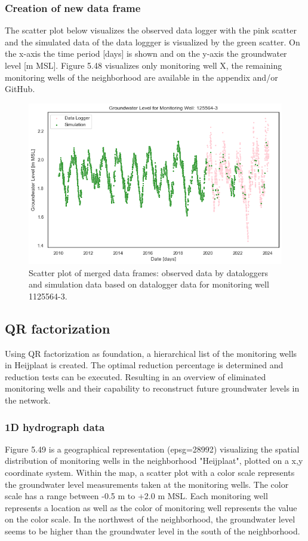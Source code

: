 \subsubsection{Creation of new data frame}
The scatter plot below visualizes the observed data logger with the pink scatter and the simulated data of the data loggger is visualized by the green scatter. On the x-axis the time period [days] is shown and on the y-axis the groundwater level [m MSL]. Figure 5.48 visualizes only monitoring well X, the remaining monitoring wells of the neighborhood are available in the appendix and/or GitHub.


\begin{figure}[htbp]
    \centering
    \includegraphics[width=0.80\linewidth]{11255643heij.png}
    \caption{Scatter plot of merged data frames: observed data by dataloggers and simulation data based on datalogger data for monitoring well 1125564-3.}   
\end{figure}


\subsection{QR factorization}
Using QR factorization as foundation, a hierarchical list of the monitoring wells in Heijplaat is created. The optimal reduction percentage is determined and reduction tests can be executed. Resulting in an overview of eliminated monitoring wells and their capability to reconstruct future groundwater levels in the network.

\subsubsection{1D hydrograph data}
Figure 5.49 is a geographical representation (epsg=28992) visualizing the spatial distribution of monitoring wells in the neighborhood "Heijplaat", plotted on a x,y coordinate system. Within the map, a scatter plot with a color scale represents the groundwater level measurements taken at the monitoring wells. The color scale has a range between -0.5 m to +2.0 m MSL. Each monitoring well represents a location as well as the color of monitoring well represents the value on the color scale. In the northwest of the neighborhood, the groundwater level seems to be higher than the groundwater level in the south of the neighborhood.

